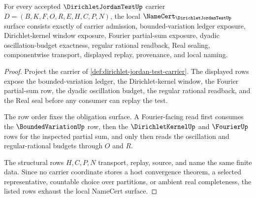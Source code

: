 \begin{theorem}
\label{thm:dirichlet-jordan-test-namecert-obligations}
For every accepted $\DirichletJordanTestUp$ carrier $D=(B,K,F,O,R,E,H,C,P,N)$, the local $\NameCert_{\DirichletJordanTestUp}$ surface consists exactly of carrier admission, bounded-variation ledger exposure, Dirichlet-kernel window exposure, Fourier partial-sum exposure, dyadic oscillation-budget exactness, regular rational readback, Real sealing, componentwise transport, displayed replay, provenance, and local naming.
\end{theorem}
\begin{proof}
Project the carrier of \autoref{def:dirichlet-jordan-test-carrier}. The displayed rows expose the bounded-variation ledger, the Dirichlet-kernel window, the Fourier partial-sum row, the dyadic oscillation budget, the regular rational readback, and the Real seal before any consumer can replay the test.

The row order fixes the obligation surface. A Fourier-facing read first consumes the $\BoundedVariationUp$ row, then the $\DirichletKernelUp$ and $\FourierUp$ rows for the inspected partial sum, and only then reads the oscillation and regular-rational budgets through $O$ and $R$.

The structural rows $H,C,P,N$ transport, replay, source, and name the same finite data. Since no carrier coordinate stores a host convergence theorem, a selected representative, countable choice over partitions, or ambient real completeness, the listed rows exhaust the local NameCert surface.
\end{proof}

